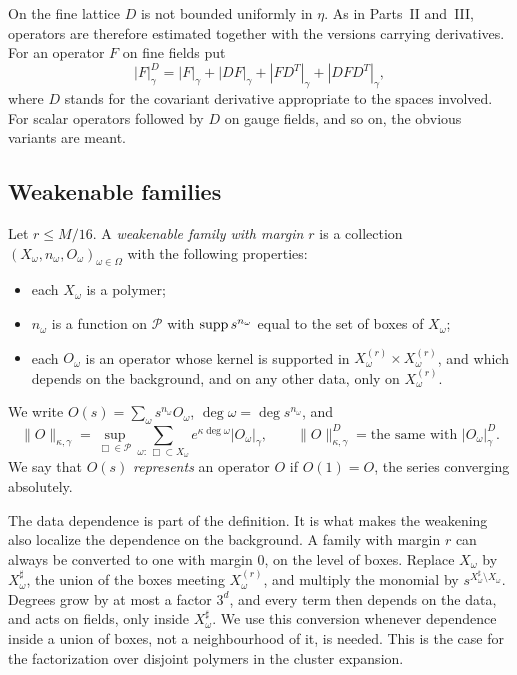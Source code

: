 On the fine lattice $D$ is not bounded uniformly in $\eta$. As in Parts~II and~III, operators are therefore estimated together with the versions carrying derivatives. For an operator $F$ on fine fields put
\[
|F|^D_\gamma=|F|_\gamma+|DF|_\gamma+|FD^T|_\gamma+|DFD^T|_\gamma ,
\]
where $D$ stands for the covariant derivative appropriate to the spaces involved. For scalar operators followed by $D$ on gauge fields, and so on, the obvious variants are meant.

\subsection{Weakenable families}\label{ss:40.2}

\begin{definition}\label{def:weak-family}
Let $r\le M/16$. A \emph{weakenable family with margin $r$} is a collection $(X_\omega,n_\omega,O_\omega)_{\omega\in\Omega}$ with the following properties:
\begin{itemize}
\item each $X_\omega$ is a polymer;
\item $n_\omega$ is a function on $\mathcal P$ with $\operatorname{supp} s^{n_\omega}$ equal to the set of boxes of $X_\omega$;
\item each $O_\omega$ is an operator whose kernel is supported in $X_\omega^{(r)}\times X_\omega^{(r)}$, and which depends on the background, and on any other data, only on $X_\omega^{(r)}$.
\end{itemize}
We write $O(s)=\sum_\omega s^{n_\omega}O_\omega$, $\deg\omega=\deg s^{n_\omega}$, and
\[
\|O\|_{\kappa,\gamma}=\sup_{\Box\in\mathcal P}\sum_{\omega:\,\Box\subset X_\omega}e^{\kappa\deg\omega}|O_\omega|_\gamma ,\qquad\|O\|^D_{\kappa,\gamma}=\text{the same with }|O_\omega|^D_\gamma .
\]
We say that $O(s)$ \emph{represents} an operator $O$ if $O(1)=O$, the series converging absolutely.
\end{definition}

The data dependence is part of the definition. It is what makes the weakening also localize the dependence on the background. A family with margin $r$ can always be converted to one with margin $0$, on the level of boxes. Replace $X_\omega$ by $X^\sharp_\omega$, the union of the boxes meeting $X_\omega^{(r)}$, and multiply the monomial by $s^{X^\sharp_\omega\setminus X_\omega}$. Degrees grow by at most a factor $3^d$, and every term then depends on the data, and acts on fields, only inside $X^\sharp_\omega$. We use this conversion whenever dependence inside a union of boxes, not a neighbourhood of it, is needed. This is the case for the factorization over disjoint polymers in the cluster expansion.

